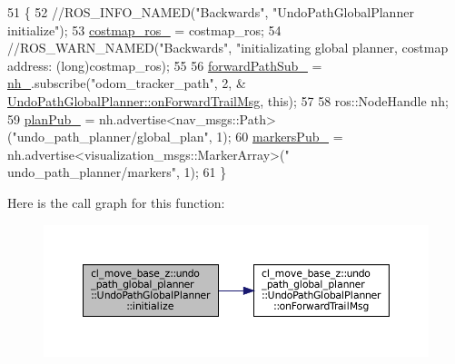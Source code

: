 \begin{DoxyCode}
51         \{
52             \textcolor{comment}{//ROS\_INFO\_NAMED("Backwards", "UndoPathGlobalPlanner initialize");}
53             \hyperlink{classcl__move__base__z_1_1undo__path__global__planner_1_1UndoPathGlobalPlanner_ab63eeb465e3ae989a6edcc4d059cf8f0}{costmap\_ros\_} = costmap\_ros;
54             \textcolor{comment}{//ROS\_WARN\_NAMED("Backwards", "initializating global planner, costmap address: %
       (long)costmap\_ros);}
55 
56             \hyperlink{classcl__move__base__z_1_1undo__path__global__planner_1_1UndoPathGlobalPlanner_a1cdf8a98469b5841d05a8cec9ad6f675}{forwardPathSub\_} = \hyperlink{classcl__move__base__z_1_1undo__path__global__planner_1_1UndoPathGlobalPlanner_a5db1360cd47ccdf63276c75f507d6470}{nh\_}.subscribe(\textcolor{stringliteral}{"odom\_tracker\_path"}, 2, &
      \hyperlink{classcl__move__base__z_1_1undo__path__global__planner_1_1UndoPathGlobalPlanner_ae5e3c5922ceb8783a6a01d904fc9c230}{UndoPathGlobalPlanner::onForwardTrailMsg}, \textcolor{keyword}{this});
57 
58             ros::NodeHandle nh;
59             \hyperlink{classcl__move__base__z_1_1undo__path__global__planner_1_1UndoPathGlobalPlanner_a65bf364a122d5950baf1bf8b42309d68}{planPub\_} = nh.advertise<nav\_msgs::Path>(\textcolor{stringliteral}{"undo\_path\_planner/global\_plan"}, 1);
60             \hyperlink{classcl__move__base__z_1_1undo__path__global__planner_1_1UndoPathGlobalPlanner_abfa0536872a0e3f8c823bebf0ed398fb}{markersPub\_} = nh.advertise<visualization\_msgs::MarkerArray>(\textcolor{stringliteral}{"
      undo\_path\_planner/markers"}, 1);
61         \}
\end{DoxyCode}
Here is the call graph for this function\+:
\nopagebreak
\begin{figure}[H]
\begin{center}
\leavevmode
\includegraphics[width=350pt]{classcl__move__base__z_1_1undo__path__global__planner_1_1UndoPathGlobalPlanner_a69e0fbb98872f108f679b2a6620638f5_cgraph}
\end{center}
\end{figure}
\mbox{\label{classcl__move__base__z_1_1undo__path__global__planner_1_1UndoPathGlobalPlanner_a46034d27c0811abae440009457a7f8b0}} 

